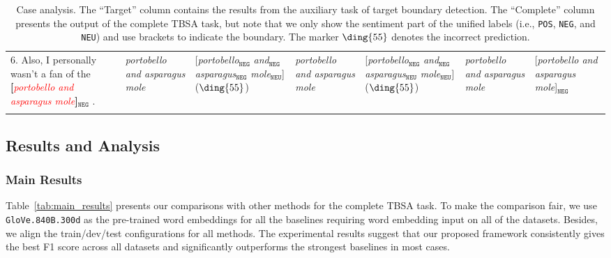 \documentclass[letterpaper]{article}
\newcommand{\xmark}{\ding{55}}
\begin{document}
\begin{table}[t]
{\begin{tabular}{@{}L{5.8cm}@{~}|@{~}L{1.8cm}@{~}|@{~}L{2.9cm}@{~}|@{~}L{1.8cm}@{~}|@{~}L{2.9cm}@{~}|@{~}L{1.8cm}@{~}|@{~}L{2.9cm}@{}}
        6. Also, I personally wasn't a fan of the \textbf{[}\textcolor{red}{\textit{portobello and asparagus mole}}\textbf{]}$_{\texttt{NEG}}$ . & \textit{portobello and asparagus mole} & [\textit{portobello}$_{\texttt{NEG}}$ \textit{and}$_{\texttt{NEG}}$ \textit{asparagus}$_{\texttt{NEG}}$ \textit{mole}$_{\texttt{NEU}}$] (${\text{\xmark}}$) & \textit{portobello and asparagus mole} & [\textit{portobello}$_{\texttt{NEG}}$ \textit{and}$_{\texttt{NEG}}$ \textit{asparagus}$_{\texttt{NEU}}$ \textit{mole}$_{\texttt{NEU}}$] (${\text{\xmark}}$) & \textit{portobello and asparagus mole} & [\textit{portobello and asparagus mole}]$_{\texttt{NEG}}$ \\
        \Xhline{3\arrayrulewidth}
    \end{tabular}}
    \caption{Case analysis. The ``Target'' column contains the results from the auxiliary task of target boundary detection. The ``Complete'' column presents the output of the complete TBSA task, but note that we only show the sentiment part of the unified labels (i.e., \texttt{POS}, \texttt{NEG}, and \texttt{NEU}) and use brackets to indicate the boundary. The marker ${\text{\xmark}}$ denotes the incorrect prediction. }
    \label{tab:case_study}
\end{table}

\subsection{Results and Analysis}
\subsubsection{Main Results}
Table~\ref{tab:main_results} presents our comparisons with other methods for the complete TBSA task. To
make the comparison fair, we use \texttt{GloVe.840B.300d} as the pre-trained word embeddings for all the baselines requiring word embedding input on all of the datasets. Besides, we align the train/dev/test configurations for all methods. The experimental results suggest that our proposed framework consistently gives the best F1 score across all datasets and significantly outperforms the strongest baselines in most cases.
\end{document}
